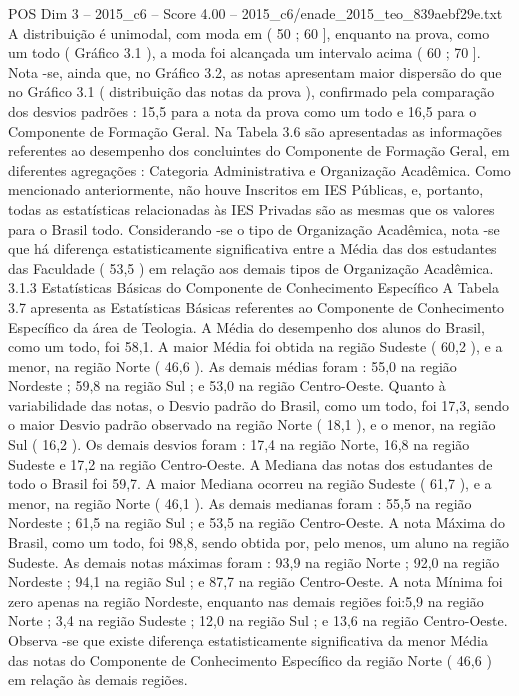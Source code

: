 \begin{textsample}{POS Dim 3 – 2015\_c6 – Score 4.00 – 2015\_c6/enade\_2015\_teo\_839aebf29e.txt}
A distribuição é unimodal, com moda em ( 50 ; 60 ], enquanto na prova, como um todo ( Gráfico 3.1 ), a moda foi alcançada um intervalo acima ( 60 ; 70 ].
Nota -se, ainda que, no Gráfico 3.2, as notas apresentam maior dispersão do que no Gráfico 3.1 ( distribuição das notas da prova ), confirmado pela comparação dos desvios padrões : 15,5 para a nota da prova como um todo e 16,5 para o Componente de Formação Geral.
Na Tabela 3.6 são apresentadas as informações referentes ao desempenho dos concluintes do Componente de Formação Geral, em diferentes agregações : Categoria Administrativa e Organização Acadêmica.
Como mencionado anteriormente, não houve Inscritos em IES Públicas, e, portanto, todas as estatísticas relacionadas às IES Privadas são as mesmas que os valores para o Brasil todo.
Considerando -se o tipo de Organização Acadêmica, nota -se que há diferença estatisticamente significativa entre a Média das dos estudantes das Faculdade ( 53,5 ) em relação aos demais tipos de Organização Acadêmica. 3.1.3 Estatísticas Básicas do Componente de Conhecimento Específico A Tabela 3.7 apresenta as Estatísticas Básicas referentes ao Componente de Conhecimento Específico da área de Teologia.
A Média do desempenho dos alunos do Brasil, como um todo, foi 58,1.
A maior Média foi obtida na região Sudeste ( 60,2 ), e a menor, na região Norte ( 46,6 ).
As demais médias foram : 55,0 na região Nordeste ; 59,8 na região Sul ; e 53,0 na região Centro-Oeste.
Quanto à variabilidade das notas, o Desvio padrão do Brasil, como um todo, foi 17,3, sendo o maior Desvio padrão observado na região Norte ( 18,1 ), e o menor, na região Sul ( 16,2 ).
Os demais desvios foram : 17,4 na região Norte, 16,8 na região Sudeste e 17,2 na região Centro-Oeste.
A Mediana das notas dos estudantes de todo o Brasil foi 59,7.
A maior Mediana ocorreu na região Sudeste ( 61,7 ), e a menor, na região Norte ( 46,1 ).
As demais medianas foram : 55,5 na região Nordeste ; 61,5 na região Sul ; e 53,5 na região Centro-Oeste.
A nota Máxima do Brasil, como um todo, foi 98,8, sendo obtida por, pelo menos, um aluno na região Sudeste.
As demais notas máximas foram : 93,9 na região Norte ; 92,0 na região Nordeste ; 94,1 na região Sul ; e 87,7 na região Centro-Oeste.
A nota Mínima foi zero apenas na região Nordeste, enquanto nas demais regiões foi:5,9 na região Norte ; 3,4 na região Sudeste ; 12,0 na região Sul ; e 13,6 na região Centro-Oeste.
Observa -se que existe diferença estatisticamente significativa da menor Média das notas do Componente de Conhecimento Específico da região Norte ( 46,6 ) em relação às demais regiões.

\end{textsample}
